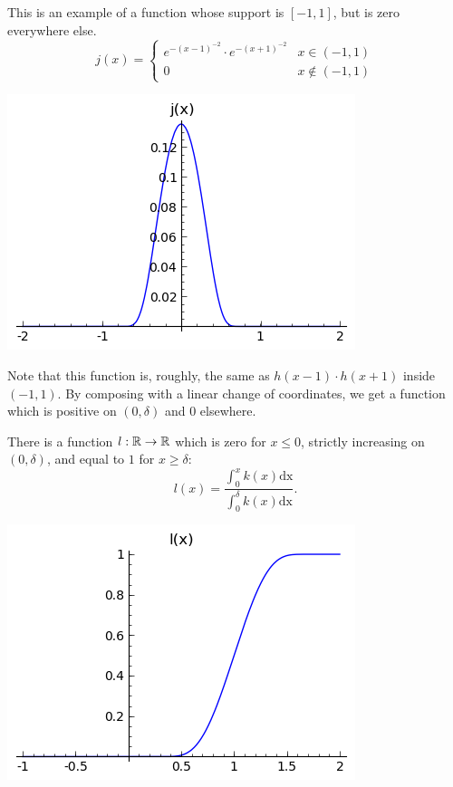 \documentclass[11pt, english]{article}
\begin{document}
\begin{example}
This is an example of a function whose support is $[-1,1]$, but is zero everywhere else.
\[
j(x) =
\begin{cases}
  e^{-(x-1)^{-2}} \cdot e^{-(x+1)^{-2}} & x \in (-1,1) \\
0 & x \not \in (-1,1)
\end{cases}
\]
\begin{center}
\includegraphics[scale=0.9]{jx} 
\end{center}
Note that this function is, roughly, the same as $h(x-1)\cdot h(x+1)$ inside $(-1,1)$. By composing with a linear change of coordinates, we get a function which is positive on $(0,\delta)$ and $0$ elsewhere.
\end{example}
\begin{example}
  There is a function $l:\mathbb{R} \to \mathbb{R}$ which is zero for $x \leq 0$, strictly increasing on $(0,\delta)$, and equal to $1$ for $x \geq \delta$:
\[
l(x) = \frac{\int_0^x k(x) \mathrm{dx}}{ \int_0^\delta k(x) \mathrm{dx}}.
\]
\begin{center}
  \includegraphics[scale=.9]{lx}
\end{center}
\end{example}
\end{document}
